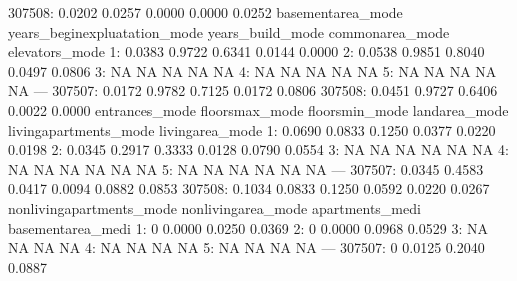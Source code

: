 \documentclass[a4paper]{article}
\begin{document}
\begin{Schunk}
\begin{Soutput}
307508:               0.0202         0.0257                  0.0000            0.0000          0.0252
        basementarea_mode years_beginexpluatation_mode years_build_mode commonarea_mode elevators_mode
     1:            0.0383                       0.9722           0.6341          0.0144         0.0000
     2:            0.0538                       0.9851           0.8040          0.0497         0.0806
     3:                NA                           NA               NA              NA             NA
     4:                NA                           NA               NA              NA             NA
     5:                NA                           NA               NA              NA             NA
    ---                                                                                               
307507:            0.0172                       0.9782           0.7125          0.0172         0.0806
307508:            0.0451                       0.9727           0.6406          0.0022         0.0000
        entrances_mode floorsmax_mode floorsmin_mode landarea_mode livingapartments_mode livingarea_mode
     1:         0.0690         0.0833         0.1250        0.0377                0.0220          0.0198
     2:         0.0345         0.2917         0.3333        0.0128                0.0790          0.0554
     3:             NA             NA             NA            NA                    NA              NA
     4:             NA             NA             NA            NA                    NA              NA
     5:             NA             NA             NA            NA                    NA              NA
    ---                                                                                                 
307507:         0.0345         0.4583         0.0417        0.0094                0.0882          0.0853
307508:         0.1034         0.0833         0.1250        0.0592                0.0220          0.0267
        nonlivingapartments_mode nonlivingarea_mode apartments_medi basementarea_medi
     1:                        0             0.0000          0.0250            0.0369
     2:                        0             0.0000          0.0968            0.0529
     3:                       NA                 NA              NA                NA
     4:                       NA                 NA              NA                NA
     5:                       NA                 NA              NA                NA
    ---                                                                              
307507:                        0             0.0125          0.2040            0.0887

\end{Soutput}
\end{Schunk}
\end{document}
